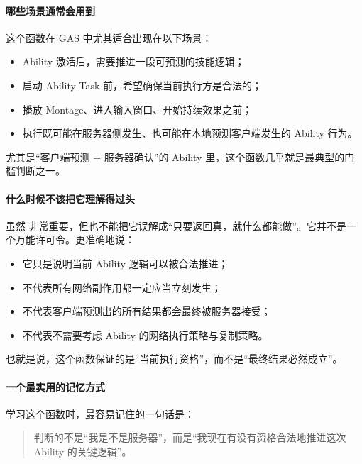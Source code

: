 \paragraph{哪些场景通常会用到 }

这个函数在 GAS 中尤其适合出现在以下场景：

\begin{itemize}
	\item Ability 激活后，需要推进一段可预测的技能逻辑；
	\item 启动 Ability Task 前，希望确保当前执行方是合法的；
	\item 播放 Montage、进入输入窗口、开始持续效果之前；
	\item 执行既可能在服务器侧发生、也可能在本地预测客户端发生的 Ability 行为。
\end{itemize}

尤其是“客户端预测 + 服务器确认”的 Ability 里，这个函数几乎就是最典型的门槛判断之一。

\paragraph{什么时候不该把它理解得过头}
虽然  非常重要，但也不能把它误解成“只要返回真，就什么都能做”。它并不是一个万能许可令。更准确地说：

\begin{itemize}
	\item 它只是说明当前 Ability 逻辑可以被合法推进；
	\item 不代表所有网络副作用都一定应当立刻发生；
	\item 不代表客户端预测出的所有结果都会最终被服务器接受；
	\item 不代表不需要考虑 Ability 的网络执行策略与复制策略。
\end{itemize}

也就是说，这个函数保证的是“当前执行资格”，而不是“最终结果必然成立”。

\paragraph{一个最实用的记忆方式}

学习这个函数时，最容易记住的一句话是：

\begin{quote}
	 判断的不是“我是不是服务器”，而是“我现在有没有资格合法地推进这次 Ability 的关键逻辑”。
\end{quote}

